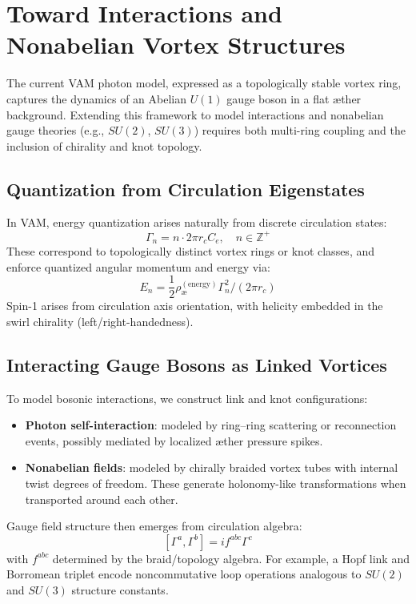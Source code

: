 \section{Toward Interactions and Nonabelian Vortex Structures}\label{sec:nonabelian}

        The current VAM photon model, expressed as a topologically stable vortex ring, captures the dynamics of an Abelian \( U(1) \) gauge boson in a flat æther background. Extending this framework to model interactions and nonabelian gauge theories (e.g., \( SU(2) \), \( SU(3) \)) requires both multi-ring coupling and the inclusion of chirality and knot topology.

        \subsection{Quantization from Circulation Eigenstates}

            In VAM, energy quantization arises naturally from discrete circulation states:
            \[
                \Gamma_n = n \cdot 2\pi r_c C_e, \quad n \in \mathbb{Z}^+
            \]
            These correspond to topologically distinct vortex rings or knot classes, and enforce quantized angular momentum and energy via:
            \[
                E_n = \frac{1}{2} \rho_\text{\ae}^{(\text{energy})} \Gamma_n^2 / (2\pi r_c)
            \]
            Spin-1 arises from circulation axis orientation, with helicity embedded in the swirl chirality (left/right-handedness).

        \subsection{Interacting Gauge Bosons as Linked Vortices}

            To model bosonic interactions, we construct link and knot configurations:
            \begin{itemize}
                \item \textbf{Photon self-interaction}: modeled by ring–ring scattering or reconnection events, possibly mediated by localized æther pressure spikes.
                \item \textbf{Nonabelian fields}: modeled by chirally braided vortex tubes with internal twist degrees of freedom. These generate holonomy-like transformations when transported around each other.
            \end{itemize}

            Gauge field structure then emerges from circulation algebra:
            \[
                [\Gamma^a, \Gamma^b] = i f^{abc} \Gamma^c
            \]
            with \( f^{abc} \) determined by the braid/topology algebra. For example, a Hopf link and Borromean triplet encode noncommutative loop operations analogous to \( SU(2) \) and \( SU(3) \) structure constants.


